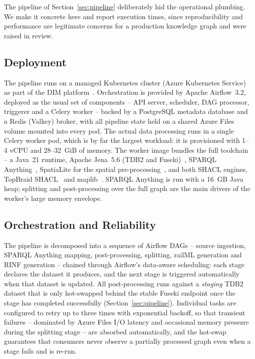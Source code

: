 \documentclass{ceurart}
\begin{document}
The pipeline of Section~\ref{sec:pipeline} deliberately hid the operational
plumbing. We make it concrete here and report execution times, since
reproducibility and performance are legitimate concerns for a production
knowledge graph and were raised in review.

\subsection{Deployment}

The pipeline runs on a managed Kubernetes cluster (Azure Kubernetes Service) as
part of the DIM platform~\cite{dim}. Orchestration is provided by Apache
Airflow~3.2, deployed as the usual set of components -- API server, scheduler,
DAG processor, triggerer and a Celery worker -- backed by a PostgreSQL metadata
database and a Redis (Valkey) broker, with all pipeline state held on a shared
Azure Files volume mounted into every pod. The actual data processing runs in a
single Celery worker pod, which is by far the largest workload: it is
provisioned with 1--4 vCPU and 28--32~GiB of memory. The worker image bundles
the full toolchain -- a Java~21 runtime, Apache Jena~5.6 (TDB2 and
Fuseki)~\cite{jena}, SPARQL Anything~\cite{sparqlanything}, SpatiaLite for the
spatial pre-processing~\cite{spatialite}, and both SHACL engines, TopBraid
SHACL~\cite{topbraidshacl} and maplib~\cite{maplib}. SPARQL Anything is run with
a 16~GB Java heap; splitting and post-processing over the full graph are the main
drivers of the worker's large memory envelope.

\subsection{Orchestration and Reliability}

The pipeline is decomposed into a sequence of Airflow DAGs -- source ingestion,
SPARQL Anything mapping, post-processing, splitting, railML generation and RINF
generation -- chained through Airflow's data-aware scheduling: each stage
declares the dataset it produces, and the next stage is triggered automatically
when that dataset is updated. All post-processing runs against a \emph{staging}
TDB2 dataset that is only hot-swapped behind the stable Fuseki endpoint once the
stage has completed successfully (Section~\ref{sec:pipeline}). Individual tasks
are configured to retry up to three times with exponential backoff, so that
transient failures -- dominated by Azure Files I/O latency and occasional memory
pressure during the splitting stage -- are absorbed automatically, and the
hot-swap guarantees that consumers never observe a partially processed graph even
when a stage fails and is re-run.
\end{document}
